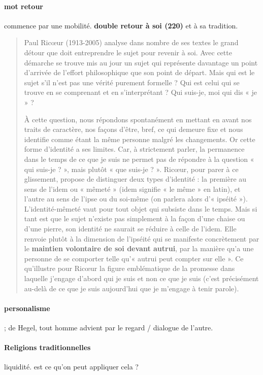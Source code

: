 \paragraph{mot retour} commence par une mobilité. \textbf{double retour à soi (220)} et à sa tradition.

\begin{quote}
    Paul Ricœur (1913-2005) analyse dans nombre de ses textes le grand détour que doit entreprendre le sujet pour revenir à soi. Avec cette démarche se trouve mis au jour un sujet qui représente davantage un point d'arrivée de l'effort philosophique que son point de départ. Mais qui est le sujet s'il n'est pas une vérité purement formelle ? Qui est celui qui se trouve en se comprenant et en s'interprétant ? Qui suis-je, moi qui dis « je » ?

À cette question, nous répondons spontanément en mettant en avant nos traits de caractère, nos façons d'être, bref, ce qui demeure fixe et nous identifie comme étant la même personne malgré les changements. Or cette forme d'identité a ses limites. Car, à strictement parler, la permanence dans le temps de ce que je suis ne permet pas de répondre à la question « qui suis-je ? », mais plutôt « que suis-je ? ». Ricœur, pour parer à ce glissement, propose de distinguer deux types d'identité : la première au sens de l'idem ou « mêmeté » (idem signifie « le même » en latin), et l'autre au sens de l'ipse ou du soi-même (on parlera alors d'« ipséité »). L'identité-mêmeté vaut pour tout objet qui subsiste dans le temps. Mais si tant est que le sujet n'existe pas simplement à la façon d'une chaise ou d'une pierre, son identité ne saurait se réduire à celle de l'idem. Elle renvoie plutôt à la dimension de l'ipséité qui se manifeste concrètement par le \textbf{maintien volontaire de soi devant autrui}, par la manière qu'a une personne de se comporter telle qu'« autrui peut compter sur elle ». Ce qu'illustre pour Ricœur la figure emblématique de la promesse dans laquelle j'engage d'abord qui je suis et non ce que je suis (c'est précisément au-delà de ce que je suis aujourd'hui que je m'engage à tenir parole).
\end{quote}
\paragraph{personalisme}; de Hegel, tout homme advient par le regard / dialogue de l'autre.




\paragraph{Religions traditionnelles} liquidité. est ce qu'on peut appliquer cela ? 

